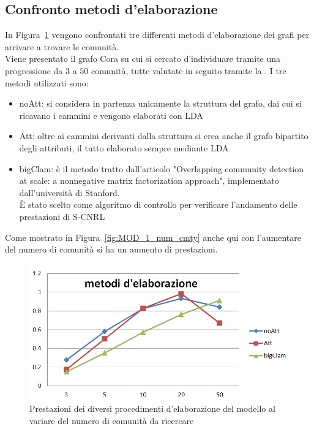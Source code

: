 \subsection{Confronto metodi d'elaborazione}
In Figura~\ref{fig:MOD_3_elaborazione} vengono confrontati tre differenti metodi d'elaborazione dei grafi per arrivare a trovare le comunità.\\
Viene presentato il grafo Cora su cui si cercato d'individuare tramite una progressione da $3$ a $50$ comunità, tutte valutate in seguito tramite la \mmod. I tre metodi utilizzati sono:
\begin{itemize}
	\item noAtt: si considera in partenza unicamente la struttura del grafo, dai cui si ricavano i cammini e vengono elaborati con LDA
	\item Att: oltre ai cammini derivanti dalla struttura si crea anche il grafo bipartito degli attributi, il tutto elaborato sempre mediante LDA
	\item bigClam: è il metodo tratto dall'articolo "Overlapping community detection at scale: a nonnegative matrix factorization approach"\cite{bigClam_paper}, implementato dall'università di Stanford\cite{bigClam_code}.\\
	È stato scelto come algoritmo di controllo per verificare l'andamento delle prestazioni di S-CNRL
\end{itemize}
Come mostrato in Figura~\ref{fig:MOD_1_num_cmty} anche qui con l'aumentare del numero di comunità si ha un aumento di prestazioni.

%
\begin{figure}[htp]
	\centering
	\includegraphics[width=\linewidth]{immagini/MOD_3_elaborazione}
	\caption{Prestazioni dei diversi procedimenti d'elaborazione del modello al variare del numero di comunità da ricercare}
	\label{fig:MOD_3_elaborazione}
\end{figure}
%
